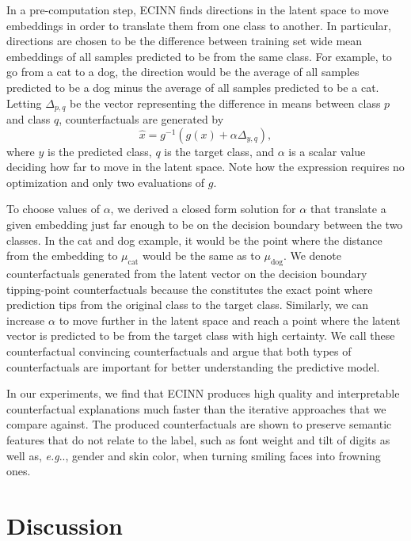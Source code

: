\documentclass[11pt,a4paper,twoside,openright,final]{memoir}
\makeatletter
\DeclareRobustCommand\onedot{\futurelet\@let@token\@onedot}
\def\@onedot{\ifx\@let@token.\else.\null\fi\xspace}
\def\eg{\emph{e.g}\onedot} \def\Eg{\emph{E.g}\onedot}
\makeatother
\begin{document}
In a pre-computation step, ECINN finds directions in the latent space to move embeddings in order to translate them from one class to another.
In particular, directions are chosen to be the difference between training set wide mean embeddings of all samples predicted to be from the same class.
For example, to go from a cat to a dog, the direction would be the average of all samples predicted to be a dog minus the average of all samples predicted to be a cat.
Letting $\Delta_{p, q}$ be the vector representing the difference in means between class $p$ and class $q$, counterfactuals are generated by
\begin{equation}
    \hat x = g^{-1}( g(x) + \alpha\Delta_{y, q}),
\end{equation}
where $y$ is the predicted class, $q$ is the target class, and $\alpha$ is a scalar value deciding how far to move in the latent space.
Note how the expression requires no optimization and only two evaluations of $g$.

To choose values of $\alpha$, we derived a closed form solution for $\alpha$ that translate a given embedding just far enough to be on the decision boundary between the two classes.
In the cat and dog example, it would be the point where the distance from the embedding to $\mu_{\text{cat}}$ would be the same as to $\mu_{\text{dog}}$. 
We denote counterfactuals generated from the latent vector on the decision boundary tipping-point counterfactuals because the constitutes the exact point where prediction tips from the original class to the target class.
Similarly, we can increase $\alpha$ to move further in the latent space and reach a point where the latent vector is predicted to be from the target class with high certainty.
We call these counterfactual convincing counterfactuals and argue that both types of counterfactuals are important for better understanding the predictive model.

In our experiments, we find that ECINN produces high quality and interpretable counterfactual explanations much faster than the iterative approaches that we compare against. 
The produced counterfactuals are shown to preserve semantic features that do not relate to the label, such as font weight and tilt of digits as well as, \eg, gender and skin color, when turning smiling faces into frowning ones.


\section{Discussion} 
\end{document}
